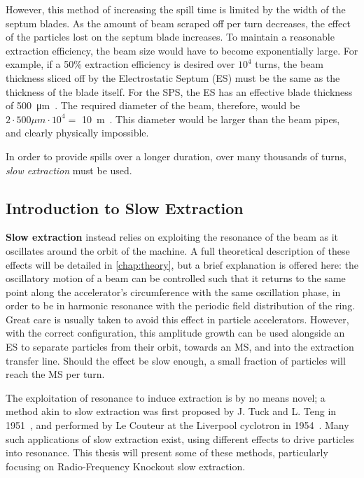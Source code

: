 \documentclass[a4paper,twoside,11pt]{report}
\begin{document}
However, this method of increasing the spill time is limited by the width of the septum blades. As the amount of beam scraped off per turn decreases, the effect of the particles lost on the septum blade increases. To maintain a reasonable extraction efficiency, the beam size would have to become exponentially large. For example, if a 50\% extraction efficiency is desired over $10^4$ turns, the beam thickness sliced off by the Electrostatic Septum (ES) must be the same as the thickness of the blade itself. For the SPS, the ES has an effective blade thickness of \qty{500}{\micro\meter}~\cite{sps-es.23.023501}. The required diameter of the beam, therefore, would be $2\cdot 500\mu m\cdot 10^4 = $ \qty{10}{\meter}~\cite{brunner}. This diameter would be larger than the beam pipes, and clearly physically impossible.

In order to provide spills over a longer duration, over many thousands of turns, \textit{slow extraction} must be used. 

\subsection{Introduction to Slow Extraction}

\textbf{Slow extraction} instead relies on exploiting the resonance of the beam as it oscillates around the orbit of the machine. A full theoretical description of these effects will be detailed in \autoref{chap:theory}, but a brief explanation is offered here: the oscillatory motion of a beam can be controlled such that it returns to the same point along the accelerator's circumference with the same oscillation phase, in order to be in harmonic resonance with the periodic field distribution of the ring. Great care is usually taken to avoid this effect in particle accelerators. However, with the correct configuration, this amplitude growth can be used alongside an ES to separate particles from their orbit, towards an MS, and into the extraction transfer line. Should the effect be slow enough, a small fraction of particles will reach the MS per turn.

The exploitation of resonance to induce extraction is by no means novel; a method akin to slow extraction was first proposed by J. Tuck and L. Teng in 1951~\cite{Couteur_1951}, and performed by Le Couteur at the Liverpool cyclotron in 1954~\cite{Couteur_1955}. Many such applications of slow extraction exist, using different effects to drive particles into resonance. This thesis will present some of these methods, particularly focusing on Radio-Frequency Knockout slow extraction.
\end{document}
